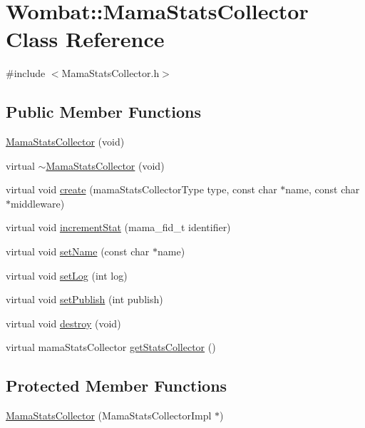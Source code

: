\hypertarget{classWombat_1_1MamaStatsCollector}{
\section{Wombat::MamaStatsCollector Class Reference}
\label{classWombat_1_1MamaStatsCollector}
}


{\ttfamily \#include $<$MamaStatsCollector.h$>$}\subsection*{Public Member Functions}
\begin{DoxyCompactItemize}
\item 
\hyperlink{classWombat_1_1MamaStatsCollector_ade3bf71a38b6085d9922a0276c9960a1}{MamaStatsCollector} (void)
\item 
virtual \hyperlink{classWombat_1_1MamaStatsCollector_adaa09d4d8b5d79473d5abb4b257d9e02}{$\sim$MamaStatsCollector} (void)
\item 
virtual void \hyperlink{classWombat_1_1MamaStatsCollector_a574746a03f75ba826672e513fc74169c}{create} (mamaStatsCollectorType type, const char $\ast$name, const char $\ast$middleware)
\item 
virtual void \hyperlink{classWombat_1_1MamaStatsCollector_a7ef024001abb5784ae0e1763a0978c76}{incrementStat} (mama\_\-fid\_\-t identifier)
\item 
virtual void \hyperlink{classWombat_1_1MamaStatsCollector_a70c32c16afbf98f98b26fb9f5ded59d0}{setName} (const char $\ast$name)
\item 
virtual void \hyperlink{classWombat_1_1MamaStatsCollector_a5a10925f5788f4e1ffbbbfd9557e5dd7}{setLog} (int log)
\item 
virtual void \hyperlink{classWombat_1_1MamaStatsCollector_a503e1008e55695191629420b7e81a5f1}{setPublish} (int publish)
\item 
virtual void \hyperlink{classWombat_1_1MamaStatsCollector_a1436a070a73bd1e998065bfc4b164c37}{destroy} (void)
\item 
virtual mamaStatsCollector \hyperlink{classWombat_1_1MamaStatsCollector_ad65e961d4ae9bdb95252cf141b406749}{getStatsCollector} ()
\end{DoxyCompactItemize}
\subsection*{Protected Member Functions}
\begin{DoxyCompactItemize}
\item 
\hyperlink{classWombat_1_1MamaStatsCollector_acd6e682017c8c4060b3303d30f4d3ad6}{MamaStatsCollector} (MamaStatsCollectorImpl $\ast$)
\end{DoxyCompactItemize}

